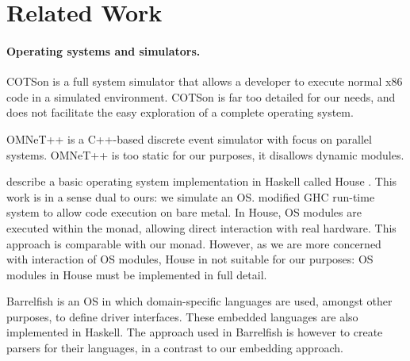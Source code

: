 %

\section{Related Work}
\label{sec:related-work}

\paragraph{Operating systems and simulators.}
COTSon \cite{cotson} is a full system simulator that allows a developer to execute normal x86 code in a simulated environment.
COTSon is far too detailed for our needs, and does not facilitate the easy exploration of a complete operating system.

OMNeT++ \cite{omnet} is a C++-based discrete event simulator with focus on parallel systems. OMNeT++ is too static for our purposes, it disallows dynamic modules.


\citeauthor{house} describe a basic operating system implementation in Haskell called House \cite{house}.
This work is in a sense dual to ours: we simulate an OS.
\citeauthor{house} modified GHC run-time system to allow code execution on bare metal.
In House, OS modules are executed within the  monad, allowing direct interaction with real hardware.
This approach is comparable with our  monad.
However, as we are more concerned with interaction of OS modules, House in not suitable for our purposes:  OS modules in House must be implemented in full detail.

Barrelfish \cite{barrelfish} is an OS in which domain-specific languages are used, amongst other purposes, to define driver interfaces.
These embedded languages are also implemented in Haskell.
The approach used in Barrelfish is however to create parsers for their languages, in a contrast to our embedding approach.


